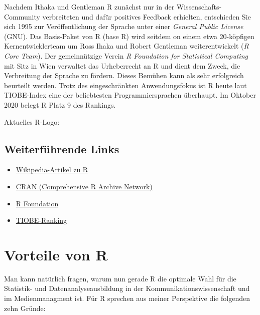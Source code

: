 \documentclass[
]{book}
\providecommand{\tightlist}{%
  \setlength{\itemsep}{0pt}\setlength{\parskip}{0pt}}
\begin{document}
Nachdem Ithaka und Gentleman R zunächst nur in der Wissenschafts-Community verbreiteten und dafür
positives Feedback erhielten, entschieden Sie sich 1995 zur Veröffentlichung der Sprache unter einer
\emph{General Public License} (GNU).
Das Basis-Paket von R (base R) wird seitdem on einem etwa 20-köpfigen Kernentwicklerteam um Ross Ihaka und Robert
Gentleman weiterentwickelt (\emph{R Core Team}).
Der gemeinnützige Verein \emph{R Foundation for Statistical Computing} mit Sitz in Wien verwaltet das Urheberrecht an R
und dient dem Zweck, die Verbreitung der Sprache zu fördern.
Dieses Bemühen kann als sehr erfolgreich beurteilt werden.
Trotz des eingeschränkten Anwendungsfokus ist R heute laut TIOBE-Index eine der beliebtesten Programmiersprachen überhaupt. Im Oktober 2020 belegt R Platz 9 des Rankings.

Aktuelles R-Logo:

\hypertarget{weiterfuxfchrende-links}{%
\subsection*{Weiterführende Links}\label{weiterfuxfchrende-links}}

\begin{itemize}
\tightlist
\item
  \href{https://de.wikipedia.org/wiki/R_(Programmiersprache)}{Wikipedia-Artikel zu R}
\item
  \href{https://cran.r-project.org/}{CRAN (Comprehensive R Archive Network)}
\item
  \href{https://www.r-project.org/foundation/}{R Foundation}
\item
  \href{https://www.tiobe.com/tiobe-index/}{TIOBE-Ranking}
\end{itemize}

\hypertarget{vorteile-von-r}{%
\section{Vorteile von R}\label{vorteile-von-r}}

Man kann natürlich fragen, warum nun gerade R die optimale Wahl für die Statistik- und Datenanalyseausbildung in der Kommunikationswissenschaft und im Medienmanagment ist. Für R sprechen aus meiner Perspektive die folgenden zehn Gründe:
\end{document}
